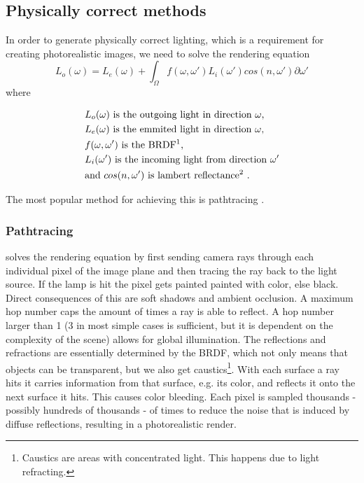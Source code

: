 \documentclass{ACGSeminar}
\begin{document}
	\subsection{Physically correct methods}
	In order to generate physically correct lighting, which is a requirement for creating photorealistic images, we need to solve the rendering equation
	$$ L_o(\omega) = L_e(\omega) + \int_\Omega f(\omega, \omega')L_i(\omega')cos(n, \omega') \partial \omega' $$
	where 
	\begin{center}
		\begin{align*}
			&L_o(\omega) \text{ is the outgoing light in direction } \omega\text{,}\\
			&L_e(\omega) \text{ is the emmited light in direction } \omega\text{,}\\
			&f(\omega, \omega') \text{ is the BRDF\footnotemark} \text{,}\\
			&L_i(\omega') \text{ is the incoming light from direction } \omega'\\
			&\text{and } cos(n, \omega') \text{ is lambert reflectance\footnotemark}  \text{ .}
		\end{align*}
	\end{center}
	\addtocounter{footnote}{-1}
	The most popular method for achieving this is pathtracing \cite{P2PATH}.
	\subsubsection{Pathtracing} 
		solves the rendering equation by first sending camera rays through each individual pixel of the image plane and then tracing the ray back to the light source. If the lamp is hit the pixel gets painted painted with color, else black. Direct consequences of this are soft shadows and ambient occlusion. A maximum hop number caps the amount of times a ray is able to reflect. A hop number larger than 1 (3 in most simple cases is sufficient, but it is dependent on the complexity of the scene) allows for global illumination. The reflections and refractions are essentially determined by the BRDF, which not only means that objects can be transparent, but we also get caustics\footnote{Caustics are areas with concentrated light. This happens due to light refracting.}. With each surface a ray hits it carries information from that surface, e.g. its color, and reflects it onto the next surface it hits. This causes color bleeding. Each pixel is sampled thousands - possibly hundreds of thousands - of times to reduce the noise that is induced by diffuse reflections, resulting in a photorealistic render.
\end{document}
